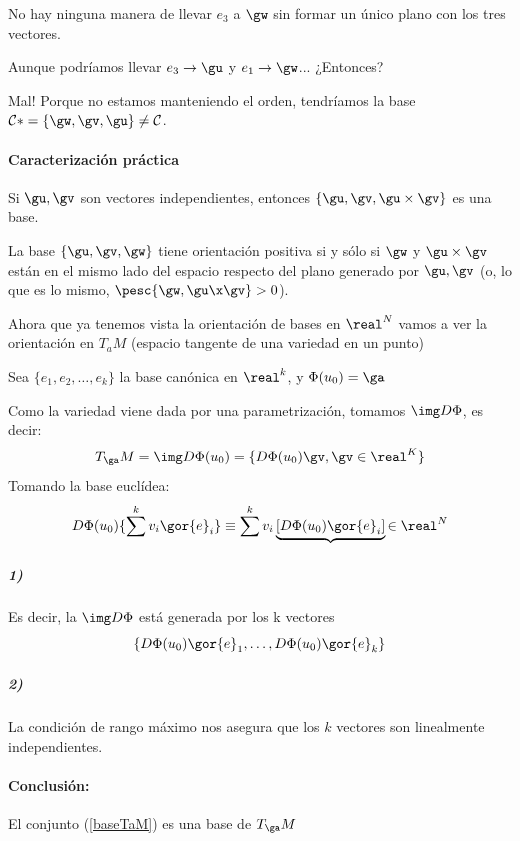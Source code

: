 No hay ninguna manera de llevar $e_3$ a $\gw$ sin formar un único plano con los tres vectores.

Aunque podríamos llevar $e_3 \to \gu$ y $e_1 \to \gw$... ¿Entonces?

Mal! Porque no estamos manteniendo el orden, tendríamos la base $\mathcal{C}* = \{\gw,\gv,\gu\}\neq\mathcal{C}$.


\paragraph{Caracterización práctica}
\begin{lemma}
\label{thmProdVect} Si $\gu,\gv$ son vectores independientes, entonces $\{ \gu,\gv,\gu\times\gv \}$ es una base.
\end{lemma}

\begin{lemma} La base $\{\gu,\gv,\gw\}$ tiene orientación positiva si y sólo si $\gw$ y $\gu\times\gv$ están en el mismo lado del espacio respecto del plano generado por $\gu,\gv$ (o, lo que es lo mismo, $\pesc{\gw,\gu\x\gv} > 0$).
\end{lemma}

Ahora que ya tenemos vista la orientación de bases en $\real^N$ vamos a ver la orientación en $T_a M$ (espacio tangente de una variedad en un punto)


Sea $\{e_1,e_2,\dotsc,e_k\}$ la base canónica en $\real^k$, y $\Phi(u_0)=\ga$

Como la variedad viene dada por una parametrización, tomamos $\img D\Phi$, es decir: \[T_{\ga}M = \img D\Phi(u_0)  = \{D\Phi(u_0)\gv,\gv\in\real^K\}\]
Tomando la base euclídea:
\[D\Phi(u_0) \{\sum^k v_i\gor{e}_i\}\equiv \sum^k v_i\underbrace{[D\Phi(u_0)\gor{e}_i]}{\in\real^N} \]

\subparagraph{1)}Es decir, la $\img D\Phi$ está generada por los k vectores \begin{equation}\label{baseTaM}
\{ D\Phi(u_0)\gor{e}_1,\dotsc ,D\Phi(u_0)\gor{e}_k \}
\end{equation}

\subparagraph{2)}
La condición de rango máximo nos asegura que los $k$ vectores son linealmente independientes.

\paragraph{Conclusión:} El conjunto (\ref{baseTaM}) es una base de $T_{\ga}M$

